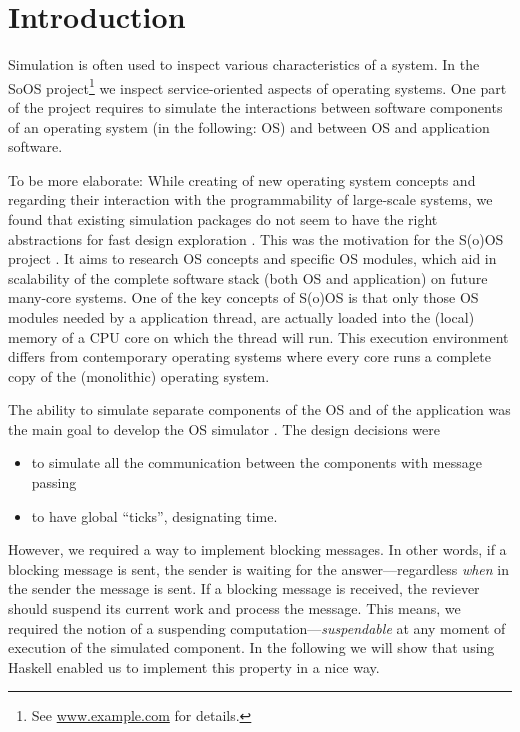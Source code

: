 \section{Introduction}

Simulation is often used to inspect various characteristics of a system.
In the SoOS project\footnote{See \url{www.example.com} for details.} we
inspect service-oriented aspects of operating systems. One part of the
project requires to simulate the interactions between software
components of an operating system (in the following: OS) and between
OS and application software.

To be more elaborate: While creating of new operating system concepts
and regarding their interaction with the programmability of
large-scale systems, we found that existing simulation packages do not
seem to have the right abstractions for fast design exploration
\cite{cotson,omnet}. This was the motivation for the S(o)OS project
\cite{soos}.  It aims to research OS concepts and specific OS modules,
which aid in scalability of the complete software stack (both OS and
application) on future many-core systems.  One of the key concepts of
S(o)OS is that only those OS modules needed by a application thread,
are actually loaded into the (local) memory of a CPU core on which the
thread will run.  This execution environment differs from contemporary
operating systems where every core runs a complete copy of the
(monolithic) operating system.

The ability to simulate separate components of the OS and of the
application was the main goal to develop the OS simulator \soosim
{}. 
 The design decisions were
\begin{itemize}
\item to simulate all the communication between the components with
  message passing
\item to have global ``ticks'', designating time.
\end{itemize}
However, we required a way to implement blocking messages. In other
words, if a blocking message is sent, the sender is waiting for the
answer---regardless \emph{when} in the sender the message is sent. If
a blocking message is received, the reviever should suspend its
current work and process the message. This
means, we required the notion of a suspending
computation---\emph{suspendable} at any moment of execution of the
simulated component. In the following we will show that using Haskell 
enabled us to implement this property in a nice way.


